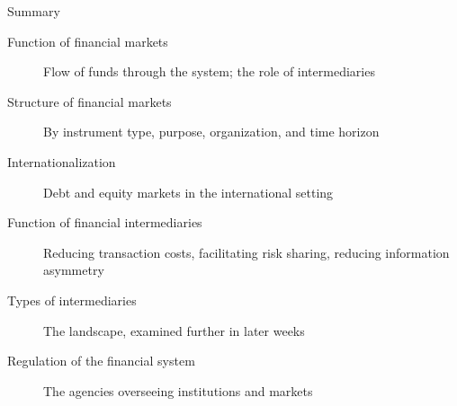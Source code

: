 \documentclass[aspectratio=169]{beamer}
\begin{document}
\begin{frame}{Summary}
\begin{description}
  \item[Function of financial markets] Flow of funds through the system; the role of intermediaries
  \item[Structure of financial markets] By instrument type, purpose, organization, and time horizon
  \item[Internationalization] Debt and equity markets in the international setting
  \item[Function of financial intermediaries] Reducing transaction costs, facilitating risk sharing, reducing information asymmetry
  \item[Types of intermediaries] The landscape, examined further in later weeks
  \item[Regulation of the financial system] The agencies overseeing institutions and markets
\end{description}
\end{frame}
\end{document}
